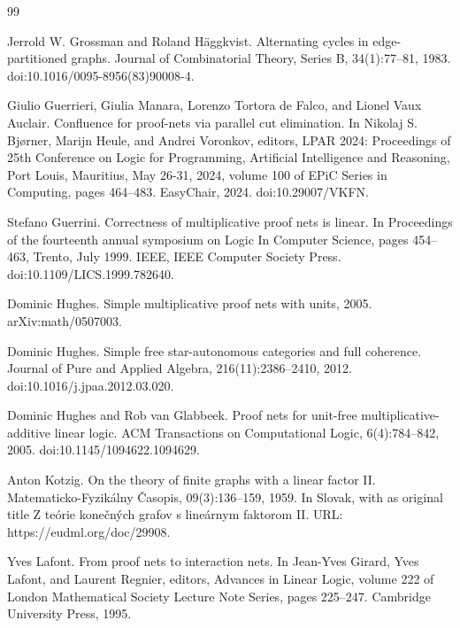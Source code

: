 \documentclass[10pt,a4paper]{amsart}
\begin{document}
\begin{thebibliography}{99}
\par\noindent  [19]  Jerrold W. Grossman and Roland Häggkvist.  Alternating cycles in edge-partitioned graphs.  Journal of Combinatorial Theory, Series B, 34(1):77–81, 1983.  doi:10.1016/0095-8956(83)90008-4.  
 
\par\noindent  [20]  Giulio Guerrieri, Giulia Manara, Lorenzo Tortora de Falco, and Lionel Vaux Auclair.  Confluence for proof-nets via parallel cut elimination.  In Nikolaj S. Bjørner, Marijn Heule, and Andrei Voronkov, editors, LPAR 2024: Proceedings of 25th Conference on Logic for Programming, Artificial Intelligence and Reasoning, Port Louis, Mauritius, May 26-31, 2024, volume 100 of EPiC Series in Computing, pages 464–483. EasyChair, 2024.  doi:10.29007/VKFN.  
 
\par\noindent  [21]  Stefano Guerrini.  Correctness of multiplicative proof nets is linear.  In Proceedings of the fourteenth annual symposium on Logic In Computer Science, pages 454–463, Trento, July 1999. IEEE, IEEE Computer Society Press.  doi:10.1109/LICS.1999.782640.  
 
\par\noindent  [22]  Dominic Hughes.  Simple multiplicative proof nets with units, 2005.  arXiv:math/0507003.  
 
\par\noindent  [23]  Dominic Hughes.  Simple free star-autonomous categories and full coherence.  Journal of Pure and Applied Algebra, 216(11):2386–2410, 2012.  doi:10.1016/j.jpaa.2012.03.020.  
 
\par\noindent  [24]  Dominic Hughes and Rob van Glabbeek.  Proof nets for unit-free multiplicative-additive linear logic.  ACM Transactions on Computational Logic, 6(4):784–842, 2005.  doi:10.1145/1094622.1094629.  
 
\par\noindent  [25]  Anton Kotzig.  On the theory of finite graphs with a linear factor II.  Matematicko-Fyzikálny Časopis, 09(3):136–159, 1959.  In Slovak, with as original title Z teórie konečných grafov s lineárnym faktorom II.  URL: https://eudml.org/doc/29908.  
 
\par\noindent  [26]  Yves Lafont.  From proof nets to interaction nets.  In Jean-Yves Girard, Yves Lafont, and Laurent Regnier, editors, Advances in Linear Logic, volume 222 of London Mathematical Society Lecture Note Series, pages 225–247. Cambridge University Press, 1995.  
 

\end{thebibliography}
\end{document}
